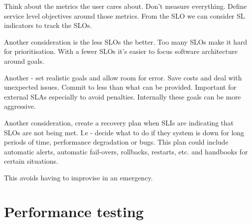Think about the metrics the user cares about.
Don't measure everything.
Define service level objectives around those metrics.
From the SLO we can consider SL indicators to track the SLOs.

Another consideration is the less SLOs the better.
Too many SLOs make it hard for prioritisation.
With a fewer SLOs it's easier to focus software architecture around goals.

Another - set realistic goals and allow room for error.
Save costs and deal with unexpected issues.
Commit to less than what can be provided.
Important for external SLAs especially to avoid penalties.
Internally these goals can be more aggressive.

Another consideration, create a recovery plan when SLIs are indicating that SLOs are not being met.
I.e - decide what to do if they system is down for long periods of time, performance degradation or bugs.
This plan could include automatic alerts, automatic fail-overs, rollbacks, restarts, etc.
and handbooks for certain situations.

This avoids having to improvise in an emergency.

\section{Performance testing}
